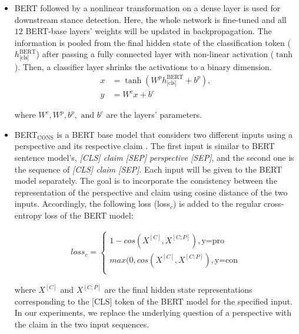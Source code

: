 \documentclass[11pt,a4paper]{article}
\begin{document}
\begin{itemize}
    \item BERT \cite{devlin-etal-2019-bert} followed by a nonlinear transformation on a dense layer is used for downstream stance detection. Here, the whole network is fine-tuned and  all  $12$ BERT-base layers' weights will be updated in backpropagation. The information is pooled from the final hidden state of the classification token ($h_{\text{[cls]}}^{\text{BERT}}$)  after passing a fully connected layer with non-linear activation ($\tanh$). Then, a classifier layer shrinks the activations to a binary dimension.
   \begin{equation*}
    \begin{aligned}
        x  & =  \tanh(W^{p}h_{\text{[cls]}}^{\text{BERT}}+b^{p}), \\
   y & =  W^{c}x+b^{c}
       \end{aligned}
    \end{equation*}

where $W^c,W^p,b^p,\text{ and }b^c$ are the layers' parameters.

\item BERT$_{\text{CONS}}$ is a BERT base model that considers two different inputs using a perspective and its respective claim \cite{Popat2019STANCYSC}. The first input is similar to BERT sentence model's, \textit{[CLS] claim [SEP] perspective [SEP]}, and the second one is the sequence of \textit{[CLS] claim [SEP]}. Each input will be given to the BERT model separately. The goal is to incorporate the consistency between the representation of the perspective and claim using cosine distance of the two inputs.  Accordingly, the following loss (loss$_c$) is added to the regular cross-entropy loss of the BERT model:

\begin{equation*}
    \begin{aligned}
    loss_c=
    \begin{cases}
         1- cos(X^{[C]}, X^{[C;P]}), \text{y=pro}  \\
         max(0,cos(X^{[C]}, X^{[C;P]}), \text{y=con}  \\
    \end{cases} 
    \end{aligned}
\end{equation*}

where $X^{[C]}$ and $X^{[C;P]}$ are the final hidden state representations corresponding to the [CLS] token of the BERT model for the specified input. In our experiments, we replace the underlying question of a perspective with the claim in the two input sequences. 


\end{itemize}
\end{document}
